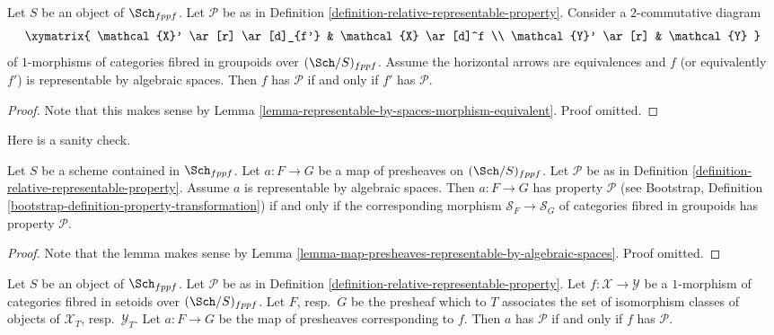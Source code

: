 \begin{lemma}
\label{lemma-property-morphism-equivalent}
Let $S$ be an object of $\Sch_{fppf}$.
Let $\mathcal{P}$ be as in
Definition \ref{definition-relative-representable-property}.
Consider a $2$-commutative diagram
$$
\xymatrix{
\mathcal{X}' \ar[r] \ar[d]_{f'} & \mathcal{X} \ar[d]^f \\
\mathcal{Y}' \ar[r] & \mathcal{Y}
}
$$
of $1$-morphisms of categories fibred in groupoids over
$(\Sch/S)_{fppf}$.
Assume the horizontal arrows are equivalences and $f$ (or equivalently $f'$)
is representable by algebraic spaces.
Then $f$ has $\mathcal{P}$ if and only if $f'$ has $\mathcal{P}$.
\end{lemma}

\begin{proof}
Note that this makes sense by
Lemma \ref{lemma-representable-by-spaces-morphism-equivalent}.
Proof omitted.
\end{proof}

\noindent
Here is a sanity check.

\begin{lemma}
\label{lemma-map-presheaves-representable-by-spaces-transformation-property}
Let $S$ be a scheme contained in $\Sch_{fppf}$.
Let $a : F \to G$ be a map of presheaves on $(\Sch/S)_{fppf}$.
Let $\mathcal{P}$ be as in
Definition \ref{definition-relative-representable-property}.
Assume $a$ is representable by algebraic spaces.
Then $a : F \to G$ has property $\mathcal{P}$ (see
Bootstrap, Definition \ref{bootstrap-definition-property-transformation})
if and only if the corresponding morphism
$\mathcal{S}_F \to \mathcal{S}_G$ of categories fibred in groupoids
has property $\mathcal{P}$.
\end{lemma}

\begin{proof}
Note that the lemma makes sense by
Lemma \ref{lemma-map-presheaves-representable-by-algebraic-spaces}.
Proof omitted.
\end{proof}

\begin{lemma}
\label{lemma-map-fibred-setoids-property}
Let $S$ be an object of $\Sch_{fppf}$. Let $\mathcal{P}$ be as in
Definition \ref{definition-relative-representable-property}.
Let $f : \mathcal{X} \to \mathcal{Y}$ be a $1$-morphism of
categories fibred in setoids over $(\Sch/S)_{fppf}$.
Let $F$, resp.\ $G$ be the presheaf which to $T$ associates
the set of isomorphism classes of objects of
$\mathcal{X}_T$, resp.\ $\mathcal{Y}_T$.
Let $a : F \to G$ be the map of presheaves corresponding to $f$.
Then $a$ has $\mathcal{P}$ if and only if $f$ has $\mathcal{P}$.
\end{lemma}

